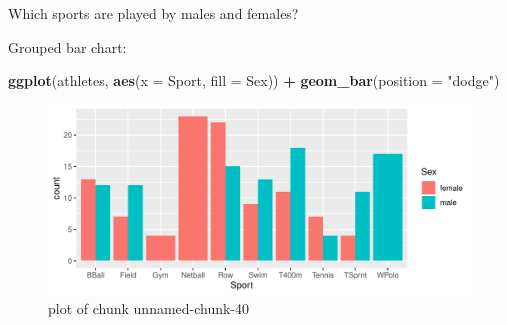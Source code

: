 \documentclass[
  ignorenonframetext,
]{beamer}
\newenvironment{Shaded}{\begin{snugshade}}{\end{snugshade}}
\newcommand{\DataTypeTok}[1]{\textcolor[rgb]{0.13,0.29,0.53}{#1}}
\newcommand{\KeywordTok}[1]{\textcolor[rgb]{0.13,0.29,0.53}{\textbf{#1}}}
\newcommand{\NormalTok}[1]{#1}
\newcommand{\OperatorTok}[1]{\textcolor[rgb]{0.81,0.36,0.00}{\textbf{#1}}}
\newcommand{\StringTok}[1]{\textcolor[rgb]{0.31,0.60,0.02}{#1}}
\begin{document}
\begin{frame}[fragile]{Which sports are played by males and females?}
\protect\hypertarget{which-sports-are-played-by-males-and-females}{}

Grouped bar chart:

\begin{Shaded}
\begin{Highlighting}[]
\KeywordTok{ggplot}\NormalTok{(athletes, }\KeywordTok{aes}\NormalTok{(}\DataTypeTok{x =}\NormalTok{ Sport, }\DataTypeTok{fill =}\NormalTok{ Sex)) }\OperatorTok{+}
\StringTok{  }\KeywordTok{geom_bar}\NormalTok{(}\DataTypeTok{position =} \StringTok{"dodge"}\NormalTok{)}
\end{Highlighting}
\end{Shaded}

\begin{figure}
\centering
\includegraphics{figure/unnamed-chunk-40-1.pdf}
\caption{plot of chunk unnamed-chunk-40}
\end{figure}

\end{frame}
\end{document}
